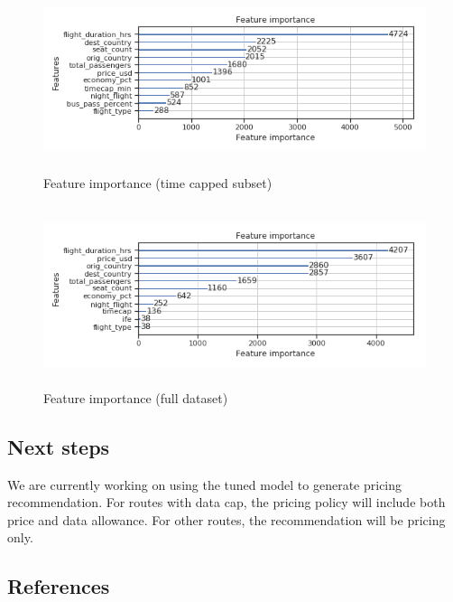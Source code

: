 \documentclass[]{article}
\begin{document}
\begin{figure}
\centering
\includegraphics[width=\textwidth,height=2.08333in]{figures/featimp_tc.png}
\caption{Feature importance (time capped subset)}
\end{figure}

\begin{figure}
\centering
\includegraphics[width=\textwidth,height=2.08333in]{figures/featimp_full.png}
\caption{Feature importance (full dataset)}
\end{figure}

\hypertarget{next-steps}{%
\subsection{Next steps}\label{next-steps}}

We are currently working on using the tuned model to generate pricing
recommendation. For routes with data cap, the pricing policy will
include both price and data allowance. For other routes, the
recommendation will be pricing only.

\pagebreak

\hypertarget{references}{%
\subsection{References}\label{references}}
\end{document}
